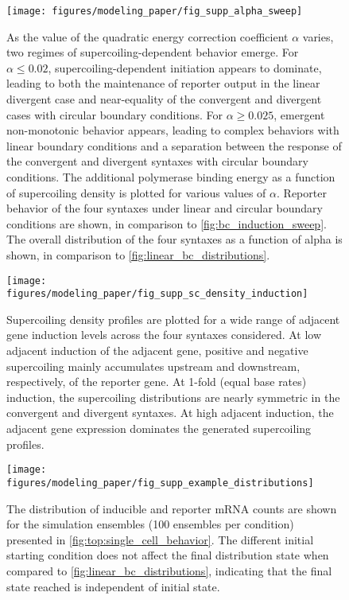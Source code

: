 \documentclass[11pt]{article}
\begin{document}
\begin{figure}[hbtp]
    \centering
    {\texttt{[image: figures/modeling\_paper/fig\_supp\_alpha\_sweep]}
    \label{fig:supp_alpha_sweep_energy}
    \label{fig:supp_alpha_sweep_linear}
    \label{fig:supp_alpha_sweep_circular}
    \label{fig:supp_alpha_sweep_distribution}
    }
    \caption{As the value of the quadratic energy correction coefficient \(\alpha\) varies, two regimes of supercoiling-dependent behavior emerge. For \(\alpha \leq 0.02\), supercoiling-dependent initiation appears to dominate, leading to both the maintenance of reporter output in the linear divergent case and near-equality of the convergent and divergent cases with circular boundary conditions. For \(\alpha \geq 0.025\), emergent non-monotonic behavior appears, leading to complex behaviors with linear boundary conditions and a separation between the response of the convergent and divergent syntaxes with circular boundary conditions.
         The additional polymerase binding energy as a function of supercoiling density is plotted for various values of \(\alpha\).
          Reporter behavior of the four syntaxes under linear and circular boundary conditions are shown, in comparison to \cref{fig:bc_induction_sweep}.
         The overall distribution of the four syntaxes as a function of alpha is shown, in comparison to \cref{fig:linear_bc_distributions}.
    }
    \label{fig:top:alpha_sweep}
\end{figure}

\begin{figure}[hbtp]
    \centering
    {\texttt{[image: figures/modeling\_paper/fig\_supp\_sc\_density\_induction]}
    }
    \caption{Supercoiling density profiles are plotted for a wide range of adjacent gene induction levels across the four syntaxes considered. At low adjacent induction of the adjacent gene, positive and negative supercoiling mainly accumulates upstream and downstream, respectively, of the reporter gene. At 1-fold (equal base rates) induction, the supercoiling distributions are nearly symmetric in the convergent and divergent syntaxes. At high adjacent induction, the adjacent gene expression dominates the generated supercoiling profiles.}
    \label{fig:supp:sc_density_induction}
\end{figure}

\begin{figure}[hbtp]
    \centering
    \texttt{[image: figures/modeling\_paper/fig\_supp\_example\_distributions]}
    \caption{The distribution of inducible and reporter mRNA counts are shown for the simulation ensembles (100 ensembles per condition) presented in \cref{fig:top:single_cell_behavior}. The different initial starting condition does not affect the final distribution state when compared to \cref{fig:linear_bc_distributions}, indicating that the final state reached is independent of initial state.}
    \label{fig:supp:fig_examples_ensemble_behavior}
\end{figure}
\end{document}
